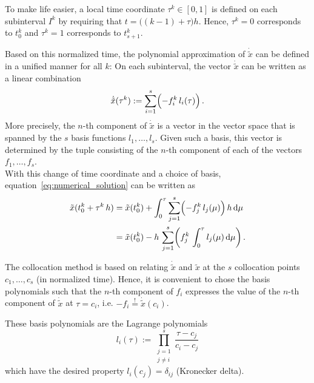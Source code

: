 \documentclass{scrartcl}
\begin{document}
To make life easier,
a local time coordinate $\tau^k \in \left[ 0, 1 \right]$ is defined
on each subinterval $I^k$ by requiring that
$t = \bigl( \left( k-1 \right) + \tau \bigr) h$.
Hence, $\tau^k = 0$ corresponds to $t_0^k$
and $\tau^k = 1$ corresponds to $t_{s+1}^k$.

Based on this normalized time,
the polynomial approximation of $\dot{\tilde{x}}$ can be defined
in a unified manner for all $k$:
On each subinterval,
the vector $\dot{\tilde{x}}$ can be written as a linear combination
\begin{equation*}
	\dot{\tilde{x}}(\tau^k) :=
	\sum\limits_{i = 1}^s \Bigl( -f_i^k \, l_i(\tau) \Bigr)
	\,.
	\label{eq:polynomial_approximation_xdot}
\end{equation*}
More precisely,
the $n$-th component of $\dot{\tilde{x}}$ is a vector in the vector space
that is spanned by the $s$ basis functions $l_1, \ldots, l_s$.
Given such a basis,
this vector is determined by the tuple consisting of
the $n$-th component of each of the vectors $f_1, \ldots, f_s$. \\

With this change of time coordinate and a choice of basis,
equation~\eqref{eq:numerical_solution} can be written as
\begin{equation*}
	\begin{alignedat}{1}
		\tilde{x}(t_0^k + \tau^k \, h)
		&= \tilde{x}(t_0^k) +
		\int_0^\tau  \sum\limits_{j=1}^s \Bigl( -f_j^k \, l_j(\mu) \Bigr)
		\, h \, \mathrm{d} \mu \\
		&= \tilde{x}(t_0^k) - h \, \sum\limits_{j=1}^s
		\biggl( f_j^k \, \int_0^\tau l_j(\mu) \, \mathrm{d} \mu \biggr)
		\,.
	\end{alignedat}
\end{equation*}

The collocation method is based on relating $\dot{\tilde{x}}$
and $\tilde{x}$ at the $s$ collocation points $c_1, \ldots, c_s$ (in normalized time).
Hence, it is convenient to chose the basis polynomials such that
the $n$-th component of $f_i$
expresses the value of the $n$-th component of $\dot{\tilde{x}}$ at $\tau = c_i$,
i.e. $-f_i \overset{!}{=} \dot{\tilde{x}}(c_i)$.

These basis polynomials are the Lagrange polynomials
\begin{equation*}
	l_i(\tau) :=
	\prod\limits_{\substack{j = 1 \\ j \neq i}}^s \frac{\tau - c_j}{c_i - c_j}
	\label{eq:Lagrange_polynomial}
\end{equation*}
which have the desired property $l_i(c_j) = \delta_{ij}$ (Kronecker delta). \\
\end{document}
